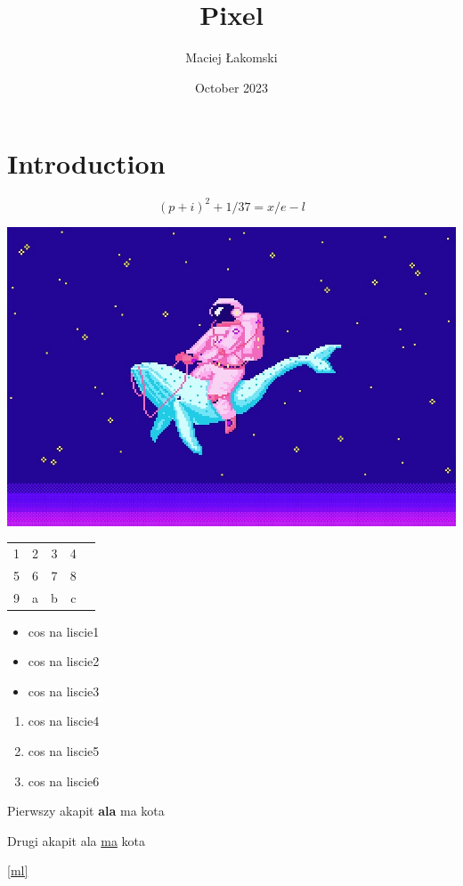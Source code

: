 \documentclass{article}
\title{Pixel}
\author{Maciej Łakomski}
\date{October 2023}
\begin{document}
\maketitle

\section{Introduction}
\[ (p+i)^2+1/37 = x/e-l \]
\begin{center}
\includegraphics{ml.jpg}
  \label{ml}
\end{center}


\begin{table}
    \centering
    \begin{tabular}{ccccc}
        1 & 2 & 3 & 4 & \\
        5 & 6 & 7 & 8 & \\
        9 & a & b & c & \\
    \end{tabular}
    \label{tab:my_label}
\begin{itemize}
  \item cos na liscie1
  \item cos na liscie2
  \item cos na liscie3
\end{itemize}
\begin{enumerate}
  \item cos na liscie4
  \item cos na liscie5
  \item cos na liscie6
\end{enumerate}
\begin{center}
    Pierwszy akapit \textbf{ala} ma kota

    Drugi akapit ala \underline{ma} kota
\end{center}
    
\end{table}


\ref{ml}
\pageref{ml}
\end{document}
